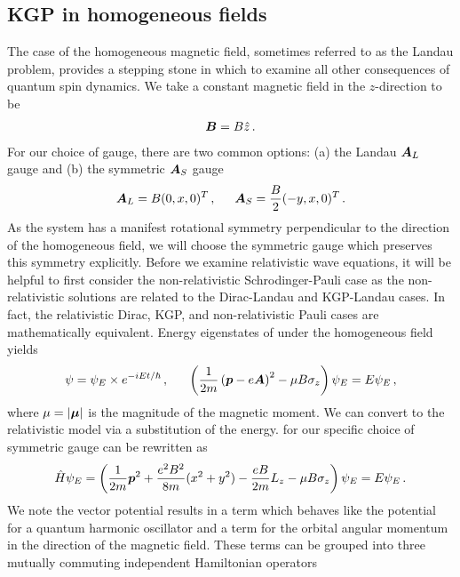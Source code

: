 \subsection{KGP in homogeneous fields}\label{ajsss:homogeneous}
\noindent The case of the homogeneous magnetic field, sometimes referred to as the Landau problem, provides a stepping stone in which to examine all other consequences of quantum spin dynamics. We take a constant magnetic field in the $z$-direction to be
\begin{alignat}{1}
	\label{eq:homogeneous:01} \boldsymbol{B}=B\hat{z}\,.
\end{alignat}
For our choice of gauge, there are two common options: (a) the Landau $\boldsymbol{A}_{L}$ gauge and (b) the symmetric $\boldsymbol{A}_{S}$ gauge
\begin{alignat}{1}
	\label{eq:homogeneous:02} \bb{A}_{L}=B(0,x,0)^{T}\,,\indent \bb{A}_{S}=\frac{B}{2}(-y,x,0)^{T}\,.
\end{alignat}
As the system has a manifest rotational symmetry perpendicular to the direction of the homogeneous field, we will choose the symmetric gauge which preserves this symmetry explicitly. Before we examine relativistic wave equations, it will be helpful to first consider the non-relativistic Schrodinger-Pauli case as the non-relativistic solutions are related to the Dirac-Landau and KGP-Landau cases. In fact, the relativistic Dirac, KGP, and non-relativistic Pauli cases are mathematically equivalent. Energy eigenstates of  under the homogeneous field  yields
\begin{alignat}{1}
	\label{eq:homogeneous:03} \psi=\psi_{E}\times e^{-iEt/\hbar}\,,\indent\left(\frac{1}{2m}\left(\bb{p}-e\bb{A}\right)^{2}-\mu B\sigma_{z}\right)\psi_{E}=E\psi_{E}\,,
\end{alignat}
where $\mu=|\boldsymbol{\mu}|$ is the magnitude of the magnetic moment. We can convert to the relativistic model via a substitution of the energy.  for our specific choice of symmetric gauge  can be rewritten as
\begin{alignat}{1}
	\label{eq:homogeneous:04} \hat{H}\psi_{E}=\left(\frac{1}{2m}\boldsymbol{p}^{2}+\frac{e^{2}B^{2}}{8m}(x^{2}+y^{2})-\frac{eB}{2m}L_{z}-\mu B\sigma_{z}\right)\psi_{E}=E\psi_{E}\,.
\end{alignat}
We note the vector potential results in a term which behaves like the potential for a quantum harmonic oscillator and a term for the orbital angular momentum in the direction of the magnetic field. These terms can be grouped into three mutually commuting independent Hamiltonian operators
